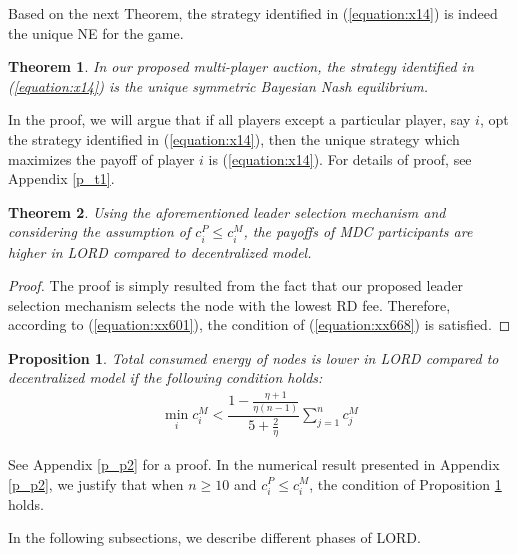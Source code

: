 \documentclass[journal,12pt, onecolumn]{IEEEtran}
\newtheorem{pr}{Proposition}
\newtheorem{thm}{Theorem}
\begin{document}
Based on the next Theorem, the strategy identified in (\ref{equation:x14}) is indeed the unique NE for the game. 

\begin{thm}\label{peoposition:sufficiency}
In our proposed multi-player auction, the strategy identified in (\ref{equation:x14}) is the unique symmetric Bayesian Nash equilibrium.
\end{thm}

In the proof, we will argue that if all players except a particular player, say $i$, opt the strategy identified in (\ref{equation:x14}), then the unique strategy which maximizes the payoff of player $i$ is (\ref{equation:x14}). For details of proof, see Appendix \ref{p_t1}.

\begin{thm}
Using the aforementioned leader selection mechanism and considering the assumption of $c_i^P \leq c_i^M$, the payoffs of MDC participants are higher in LORD compared to decentralized model.
\end{thm}

\begin{proof}
The proof is simply resulted from the fact that our proposed leader selection mechanism selects the node with the lowest RD fee. Therefore, according to (\ref{equation:xx601}), the condition of (\ref{equation:xx668}) is satisfied. 
\end{proof}

\begin{pr}\label{energy_saving}
Total consumed energy of nodes is lower in LORD compared to decentralized model if the following condition holds:
\vspace{-2mm}
\begin{align*}
\min_i c_i^M < \dfrac{1- \frac{\eta +1}{\eta(n-1)}}{5+ \frac{2}{\eta} } \sum_{j=1}^n c_j^M
\end{align*}
\end{pr}
See Appendix \ref{p_p2} for a proof. In the numerical result presented in Appendix \ref{p_p2}, we justify that when $n \geq 10$ and $c_i^P \leq c_i^M$, the condition of Proposition \ref{energy_saving} holds. 

In the following subsections, we describe different phases of LORD.
\end{document}
